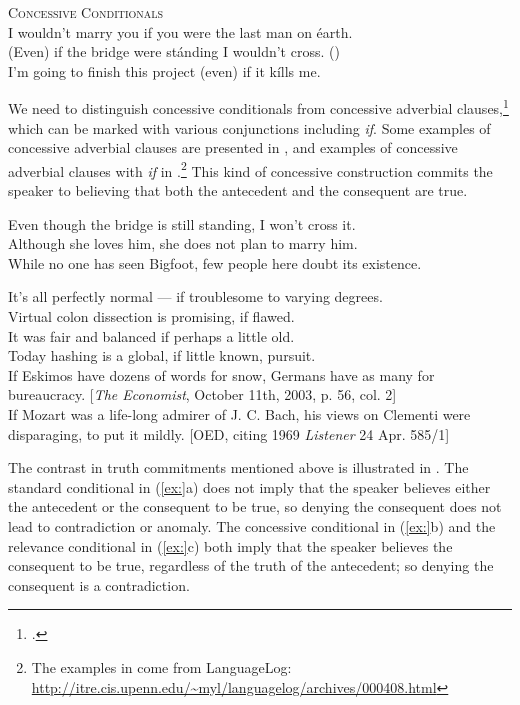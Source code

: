 \ea
\textsc{Concessive Conditionals}\\
\ea I wouldn’t marry you if you were the last man on éarth.\\
\ex (Even) if the bridge were stánding I wouldn’t cross. (\citealt{Bennett1982})\\
\ex I’m going to finish this project (even) if it kílls me.
                       \z
\z


We need to distinguish concessive conditionals from concessive adverbial clauses,\footnote{\citet{ThompsonEtAl2007}.} which can be marked with various conjunctions including \textit{if}. Some examples of concessive adverbial clauses are presented in , and examples of concessive adverbial clauses with \textit{if} in .\footnote{The examples in  come from LanguageLog: \url{http://itre.cis.upenn.edu/~myl/languagelog/archives/000408.html}}  This kind of concessive construction commits the speaker to believing that both the antecedent and the consequent are true.


\ea
\ea Even though the bridge is still standing, I won’t cross it.\\
\ex Although she loves him, she does not plan to marry him.\\
\ex While no one has seen Bigfoot, few people here doubt its existence.
                       \z
\z

\ea
\ea It’s all perfectly normal — if troublesome to varying degrees.\\
\ex Virtual colon dissection is promising, if flawed.\\
\ex It was fair and balanced if perhaps a little old.\\
\ex Today hashing is a global, if little known, pursuit.\\
\ex If Eskimos have dozens of words for snow, Germans have as many for\\
  bureaucracy. [\textit{The Economist}, October 11th, 2003, p. 56, col. 2]\\
\ex If Mozart was a life-long admirer of J. C. Bach, his views on Clementi were\\
  disparaging, to put it mildly.  [OED, citing 1969 \textit{Listener} 24 Apr. 585/1]
                       \z
\z


The contrast in truth commitments mentioned above is illustrated in . The standard conditional in (\ref{ex:}a) does not imply that the speaker believes either the antecedent or the consequent to be true, so denying the consequent does not lead to contradiction or anomaly. The concessive conditional in (\ref{ex:}b) and the relevance conditional in (\ref{ex:}c) both imply that the speaker believes the consequent to be true, regardless of the truth of the antecedent; so denying the consequent is a contradiction.


